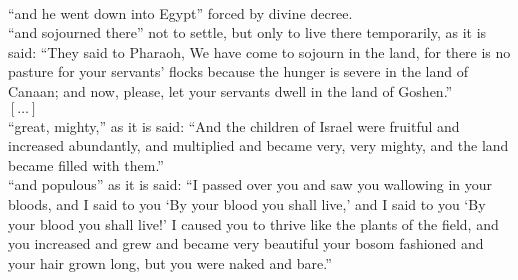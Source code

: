 \documentclass[a4paper,10pt,openany]{memoir}
\newcommand{\HgEllipsis}{\ensuremath{\left[\ldots\right]}}
\newenvironment{HgEnglish}{\strut\\\noindent}{\vspace{1em}}
\begin{document}
\begin{HgEnglish}

\noindent
``and he went down into Egypt'' forced by divine decree.\\

\noindent
``and sojourned there'' not to settle, but only to live there temporarily, as
it is said: ``They said to Pharaoh, We have come to sojourn in the land, for
there is no pasture for your servants' flocks because the hunger is severe in
the land of Canaan; and now, please, let your servants dwell in the land of
Goshen.''\\

\noindent\HgEllipsis \\

% 

\noindent
``great, mighty,'' as it is said: ``And the children of Israel were fruitful and
increased abundantly, and multiplied and became very, very mighty, and the land
became filled with them.''\\

\noindent
``and populous'' as it is said: ``I passed over you and saw you wallowing in
your bloods, and I said to you `By your blood you shall live,' and I said to you
`By your blood you shall live!' I caused you to thrive like the plants of the
field, and you increased and grew and became very beautiful your bosom fashioned
and your hair grown long, but you were naked and bare.''\\



\end{HgEnglish}
\end{document}
